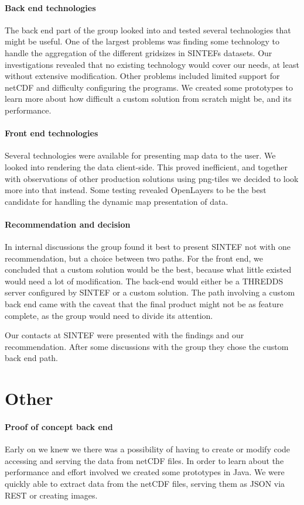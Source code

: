 \documentclass[11pt,a4paper,titlepage,oneside]{report}
\begin{document}
\paragraph{Back end technologies}
The back end part of the group looked into and tested several technologies that might be useful. One of the largest problems was finding some technology to handle the aggregation of the different gridsizes in SINTEFs datasets. Our investigations revealed that no existing technology would cover our needs, at least without extensive modification. Other problems included limited support for netCDF and difficulty configuring the programs. We created some prototypes to learn more about how difficult a custom solution from scratch might be, and its performance.

\paragraph{Front end technologies}
Several technologies were available for presenting map data to the user. We looked into rendering the data client-side. This proved inefficient, and together with observations of other production solutions using png-tiles we decided to look more into that instead. Some testing revealed OpenLayers to be the best candidate for handling the dynamic map presentation of data.

\paragraph{Recommendation and decision}
In internal discussions the group found it best to present SINTEF not with one recommendation, but a choice between two paths. For the front end, we concluded that a custom solution would be the best, because what little existed would need a lot of modification. The back-end would either be a THREDDS server configured by SINTEF or a custom solution. The path involving a custom back end came with the caveat that the final product might not be as feature complete, as the group would need to divide its attention.
\par Our contacts at SINTEF were presented with the findings and our recommendation. After some discussions with the group they chose the custom back end path.

\section{Other}

\paragraph{Proof of concept back end}
Early on we knew we there was a possibility of having to create or modify code accessing and serving the data from netCDF files. In order to learn about the performance and effort involved we created some prototypes in Java. We were quickly able to extract data from the netCDF files, serving them as JSON via REST or creating images.
\end{document}
